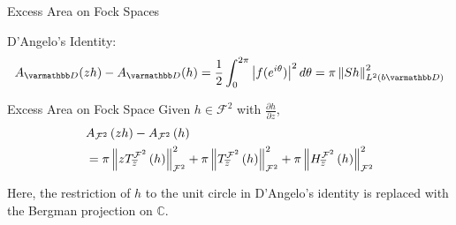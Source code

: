 \documentclass{reu_beamer}
\begin{document}
\begin{frame}{Excess Area on Fock Spaces}
    \begin{center}
        \small
        D'Angelo's Identity: 
        \[A_{\mathbb{D}}(zh) - A_{\mathbb{D}}(h) = \frac{1}{2}\int_0^{2\pi}\left|f(e^{i\theta})\right|^2d\theta = \pi \norm{Sh}_{L^{2}(b\mathbb{D})}^2\]
    \end{center}
    \begin{block}{Excess Area on Fock Space}
    Given $h\in \mathcal{F}^2 $ with $\frac{\partial h}{\partial z}$,
    \begin{align*}
        &A_{\mathcal{F}^2}\left(zh\right) - A_{\mathcal{F}^2}\left(h\right) \\
        &= \pi \left\Vert zT^{\mathcal{F}^2}_{\overline{z}}\left(h\right) \right\Vert_{\mathcal{F}^2}^2+\pi\left\Vert T^{\mathcal{F}^2}_{\overline{z}}\left(h\right) \right\Vert_{\mathcal{F}^2}^2+ \pi\left\Vert H^{\mathcal{F}^2}_{\overline{z}}\left(h\right) \right\Vert_{\mathcal{F}^2}^2
    \end{align*}
    \end{block}  
    Here, the restriction of \(h\) to the unit circle in D'Angelo's identity is replaced with the Bergman projection on $\mathbb{C}$.\\
\end{frame}
\end{document}

